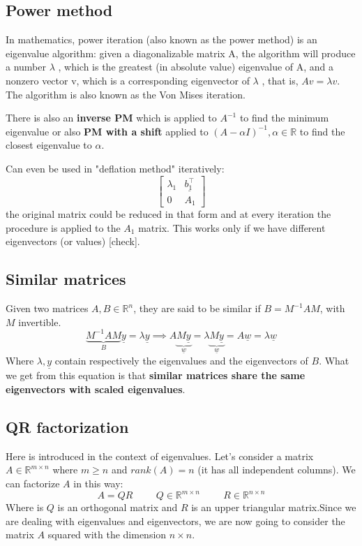 \subsection{Power method}
In mathematics, power iteration (also known as the power method) is an eigenvalue algorithm: given a diagonalizable matrix A, the algorithm will produce a number $\lambda$ , which is the greatest (in absolute value) eigenvalue of A, and a nonzero vector v, which is a corresponding eigenvector of $\lambda$ , that is, $Av=\lambda v$. The algorithm is also known as the Von Mises iteration.

There is also an \textbf{inverse PM} which is applied to $A^{-1}$ to find the minimum eigenvalue or also \textbf{PM with a shift} applied to $(A-\alpha I)^{-1}, \alpha \in \mathbb{R}$ to find the closest eigenvalue to $\alpha$. 

Can even be used in "deflation method" iteratively:
\[
    \begin{bmatrix}
        \lambda_1 & \underline{b_1^\intercal}\\
        0 & A_1
    \end{bmatrix}    
\]
the original matrix could be reduced in that form and at every iteration the procedure is applied to the $A_1$ matrix. This works only if we have different eigenvectors (or values) [check].

\subsection{Similar matrices}
Given two matrices $A, B \in \mathbb{R}^n$, they are said to be similar if $B = M^{-1}AM$, with $M$ invertible. 
\[
    \underbrace{M^{-1}AM}_{B}\underline{y} = \lambda \underline{y} \implies A\underbrace{M\underline{y}}_{\underline{w}} = \lambda \underbrace{M\underline{y}}_{\underline{w}} = A\underline{w} = \lambda \underline{w}    
\]
Where $\lambda, \underline{y}$ contain respectively the eigenvalues and the eigenvectors of $B$. What we get from this equation is that \textbf{similar matrices share the same eigenvectors with scaled eigenvalues}.

\subsection{QR factorization}
Here is introduced in the context of eigenvalues. Let's consider a matrix $A \in \mathbb{R}^{m\times n}$ where $m \geq n$ and $rank(A) = n$ (it has all independent columns). We can factorize $A$ in this way:
\[
    A = QR \hspace{1cm} Q \in \mathbb{R}^{m\times n} \hspace{1cm} R \in \mathbb{R}^{n\times n}
\]
Where is $Q$ is an orthogonal matrix and $R$ is an upper triangular matrix.Since we are dealing with eigenvalues and eigenvectors, we are now going to consider the matrix $A$ squared with the dimension $n\times n$.

